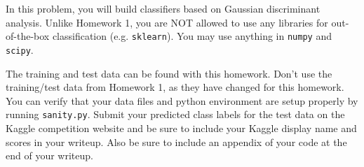\documentclass[11pt]{article}
\begin{document}
\newpage
{}

In this problem, you will build classifiers based on Gaussian discriminant analysis. Unlike Homework 1, you are NOT allowed to use any libraries for out-of-the-box classification (e.g. {\tt sklearn}). You may use anything in {\tt numpy} and {\tt scipy}.

The training and test data can be found with this homework. Don't use the training/test data from Homework 1, as they have changed for this homework. You can verify that your data files and python environment are setup properly by running {\tt sanity.py}. Submit your predicted class labels for the test data on the Kaggle competition website and be sure to include your Kaggle display name and scores in your writeup. Also be sure to include an appendix of your code at the end of your writeup.
\end{document}
